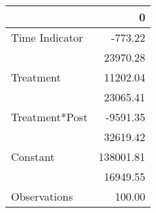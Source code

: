 \begin{tabular}{lr}
\toprule
{} &          0 \\
\midrule
Time Indicator &    -773.22 \\
               &   23970.28 \\
Treatment      &   11202.04 \\
               &   23065.41 \\
Treatment*Post &   -9591.35 \\
               &   32619.42 \\
Constant       &  138001.81 \\
               &   16949.55 \\
Observations   &     100.00 \\
\bottomrule
\end{tabular}
